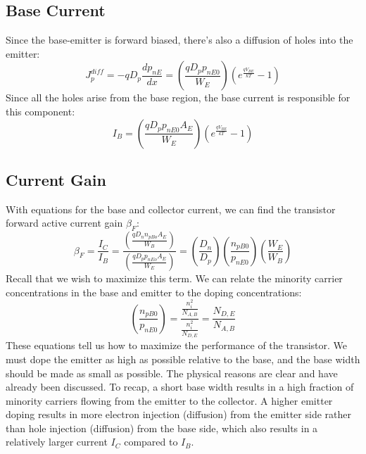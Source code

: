 \subsection{Base Current}

Since the base-emitter is forward biased, there's also a diffusion of holes into the emitter:
% 
\begin{equation}
	J_p^{diff} =  - q{D_p}\frac{{d{p_{nE}}}}{{dx}} = \left( {\frac{{q{D_p}{p_{nE0}}}}{{{W_E}}}} \right)\left( 	{{e^{\frac{{q{V_{BE}}}}{{kT}}}} - 1} \right)
\end{equation}
%
Since all the holes arise from the base region, the base current is responsible for this component:
% 
\begin{equation}
	{I_B} = \left( {\frac{{q{D_p}{p_{nE0}}{A_E}}}{{{W_E}}}} \right)\left( {{e^{\frac{{q{V_{BE}}}}{{kT}}}} - 1} \right)
\end{equation}





\subsection{Current Gain}

With equations for the base and collector current, we can find the transistor forward active current gain $\beta_F$:
%
\begin{equation}
	{\beta _F} = \frac{{{I_C}}}{{{I_B}}} = \frac{{\left( {\frac{{q{D_n}{n_{pBo}}{A_E}}}{{{W_B}}}} \right)}}{{\left( {\frac{{q{D_p}{p_{nEo}}{A_E}}}{{{W_E}}}} \right)}} = \left( {\frac{{{D_n}}}{{{D_p}}}} \right)\left( {\frac{{{n_{pB0}}}}{{{p_{nE0}}}}} \right)\left( {\frac{{{W_E}}}{{{W_B}}}} \right)\end{equation}
%
Recall that we wish to maximize this term.  We can relate the minority carrier concentrations in the base and emitter to the doping concentrations:
%
\begin{equation}
	\left( {\frac{{{n_{pB0}}}}{{{p_{nE0}}}}} \right) = \frac{{\frac{{n_i^2}}{{{N_{A,B}}}}}}{{\frac{{n_i^2}}	{{{N_{D,E}}}}}} = \frac{{{N_{D,E}}}}{{{N_{A,B}}}}
\end{equation}
%
These equations tell us how to maximize the performance of the transistor.  We must dope the emitter as high as possible relative to the base, and the base width should be made as small as possible.  The physical reasons are clear and have already been discussed.  To recap, a short base width results in a high fraction of minority carriers flowing from the emitter to the collector.  A higher emitter doping results in more electron injection (diffusion) from the emitter side rather than hole injection (diffusion) from the base side, which also results in a relatively larger current $I_C$ compared to $I_B$.



